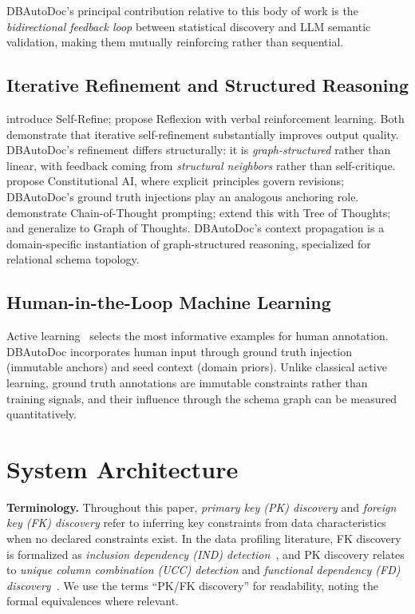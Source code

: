\documentclass[sigconf, nonacm]{acmart}
\begin{document}
DBAutoDoc's principal contribution relative to this body of work is the \emph{bidirectional feedback loop} between statistical discovery and LLM semantic validation, making them mutually reinforcing rather than sequential.

\subsection{Iterative Refinement and Structured Reasoning}

\cite{madaan2023selfrefine} introduce Self-Refine; \cite{shinn2023reflexion} propose Reflexion with verbal reinforcement learning. Both demonstrate that iterative self-refinement substantially improves output quality. DBAutoDoc's refinement differs structurally: it is \emph{graph-structured} rather than linear, with feedback coming from \emph{structural neighbors} rather than self-critique. \cite{bai2022constitutional} propose Constitutional AI, where explicit principles govern revisions; DBAutoDoc's ground truth injections play an analogous anchoring role. \cite{wei2022cot} demonstrate Chain-of-Thought prompting; \cite{yao2023tot} extend this with Tree of Thoughts; and \cite{besta2024got} generalize to Graph of Thoughts. DBAutoDoc's context propagation is a domain-specific instantiation of graph-structured reasoning, specialized for relational schema topology.

\subsection{Human-in-the-Loop Machine Learning}

Active learning~\cite{settles2009active} selects the most informative examples for human annotation. DBAutoDoc incorporates human input through ground truth injection (immutable anchors) and seed context (domain priors). Unlike classical active learning, ground truth annotations are immutable constraints rather than training signals, and their influence through the schema graph can be measured quantitatively.


\section{System Architecture}\label{sec:architecture}

\textbf{Terminology.} Throughout this paper, \emph{primary key (PK) discovery} and \emph{foreign key (FK) discovery} refer to inferring key constraints from data characteristics when no declared constraints exist. In the data profiling literature, FK discovery is formalized as \emph{inclusion dependency (IND) detection}~\cite{papenbrock2015binder,dursch2019ind}, and PK discovery relates to \emph{unique column combination (UCC) detection} and \emph{functional dependency (FD) discovery}~\cite{huhtala1999tane,papenbrock2016hyfd}. We use the terms ``PK/FK discovery'' for readability, noting the formal equivalences where relevant.
\end{document}
